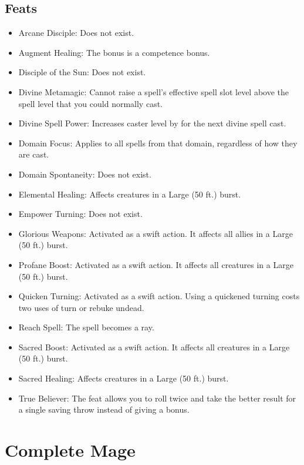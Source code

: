 \subsection{Feats}
\begin{itemize}
\item Arcane Disciple: Does not exist.
\item Augment Healing: The bonus is a competence bonus.
\item Disciple of the Sun: Does not exist.
\item Divine Metamagic: Cannot raise a spell's effective spell slot level above the spell level that you could normally cast.
\item Divine Spell Power: Increases caster level by  for the next divine spell cast.
\item Domain Focus: Applies to all spells from that domain, regardless of how they are cast.
\item Domain Spontaneity: Does not exist.
\item Elemental Healing: Affects creatures in a Large (50 ft.) burst.
\item Empower Turning: Does not exist.
\item Glorious Weapons: Activated as a swift action. It affects all allies in a Large (50 ft.) burst.
\item Profane Boost: Activated as a swift action. It affects all creatures in a Large (50 ft.) burst.
\item Quicken Turning: Activated as a swift action. Using a quickened turning costs two uses of turn or rebuke undead.
\item Reach Spell: The spell becomes a ray.
\item Sacred Boost: Activated as a swift action. It affects all creatures in a Large (50 ft.) burst.
\item Sacred Healing: Affects creatures in a Large (50 ft.) burst.
\item True Believer: The feat allows you to roll twice and take the better result for a single saving throw instead of giving a bonus.
\end{itemize}

\section{Complete Mage}
